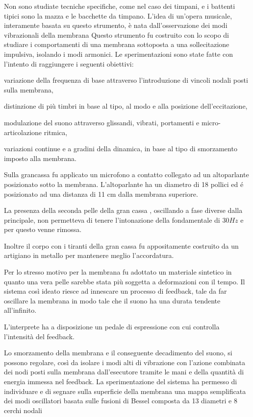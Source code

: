 Non sono studiate tecniche specifiche, come nel caso dei timpani, e i battenti
tipici sono la mazza e le bacchette da timpano. L’idea di un’opera musicale,
interamente basata su questo strumento, è nata dall’osservazione dei modi
vibrazionali della membrana
Questo strumento fu costruito con lo scopo di studiare i comportamenti di una
membrana sottoposta a una sollecitazione impulsiva, isolando i modi armonici.
Le sperimentazioni sono state fatte con l’intento di raggiungere i seguenti
obiettivi:
\begin{compactitems}
  \item variazione della frequenza di base attraverso l’introduzione di vincoli
nodali posti sulla membrana,
  \item distinzione di più timbri in base al tipo, al modo e alla posizione
dell’eccitazione,
  \item modulazione del suono attraverso glissandi, vibrati, portamenti e
micro-articolazione ritmica,
  \item variazioni continue e a gradini della dinamica, in base al tipo di
  smorzamento imposto alla membrana.
\end{compactitems}

Sulla grancassa fu applicato un microfono a contatto collegato ad un altoparlante
posizionato sotto la membrana.
L’altoparlante ha un diametro di 18 pollici ed é posizionato ad una distanza di
11 cm dalla membrana superiore.


La presenza della seconda pelle della gran cassa , oscillando a fase diverse
dalla principale, non permetteva di tenere l’intonazione della fondamentale di
$30Hz$ e per questo venne rimossa.

Inoltre il corpo con i tiranti della gran cassa fu appositamente costruito da un
artigiano in metallo per mantenere meglio l’accordatura.

Per lo stresso motivo per la membrana fu adottato  un materiale sintetico in
quanto una vera pelle sarebbe stata più soggetta a deformazioni con il tempo.
Il sistema così ideato riesce ad innescare un processo di feedback, tale da far
oscillare la membrana in modo tale che il suono ha una durata tendente
all’infinito.

L’interprete ha a disposizione un pedale di espressione con cui controlla
l’intensità del feedback.

Lo smorzamento della membrana e il conseguente decadimento del suono, si possono
regolare, così da isolare i modi alti di vibrazione con l’azione combinata dei
nodi posti sulla membrana dall’esecutore tramite le mani e della quantità di
energia immessa nel feedback. La sperimentazione del sistema ha permesso di
individuare e di segnare sulla superficie della membrana una mappa semplificata
dei modi oscillatori basata sulle fusioni di Bessel composta da 13 diametri e
8 cerchi nodali

